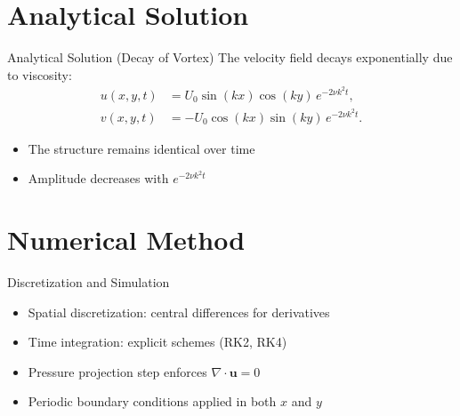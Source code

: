 \documentclass{beamer}
\begin{document}
\section{Analytical Solution}
\begin{frame}{Analytical Solution (Decay of Vortex)}
The velocity field decays exponentially due to viscosity:
\[
\begin{aligned}
u(x,y,t) &= U_0 \sin(kx)\cos(ky)\, e^{-2\nu k^2 t}, \\
v(x,y,t) &= -U_0 \cos(kx)\sin(ky)\, e^{-2\nu k^2 t}.
\end{aligned}
\]

\begin{itemize}
    \item The structure remains identical over time
    \item Amplitude decreases with $e^{-2\nu k^2 t}$
\end{itemize}
\end{frame}

\section{Numerical Method}
\begin{frame}{Discretization and Simulation}
\begin{itemize}
    \item Spatial discretization: central differences for derivatives
    \item Time integration: explicit schemes (RK2, RK4)
    \item Pressure projection step enforces $\nabla \cdot \mathbf{u} = 0$
    \item Periodic boundary conditions applied in both $x$ and $y$
\end{itemize}
\end{frame}

\end{document}
